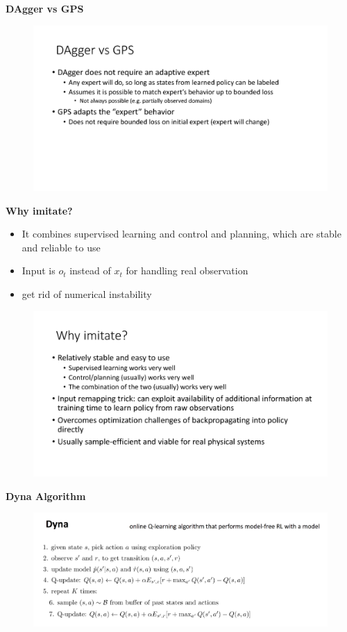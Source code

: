 \documentclass{article}
\begin{document}
\noindent\textbf{DAgger vs GPS} 
\begin{figure}[H]
    \centering
        \includegraphics[width=0.8\linewidth]{img/DAgger_vs_GPS.png}
\end{figure}

\noindent\textbf{Why imitate?} 

\begin{itemize}
	\item It combines supervised learning and control and planning, which are stable and reliable to use
	\item Input is $o_t$ instead of $x_t$ for handling real observation
	\item get rid of numerical instability
\end{itemize}

\begin{figure}[H]
    \centering
        \includegraphics[width=0.8\linewidth]{img/why_imitate.png}
\end{figure}

\noindent\textbf{Dyna Algorithm} 

\begin{figure}[H]
    \centering
        \includegraphics[width=0.8\linewidth]{img/Dyna.png}
\end{figure}
\end{document}
